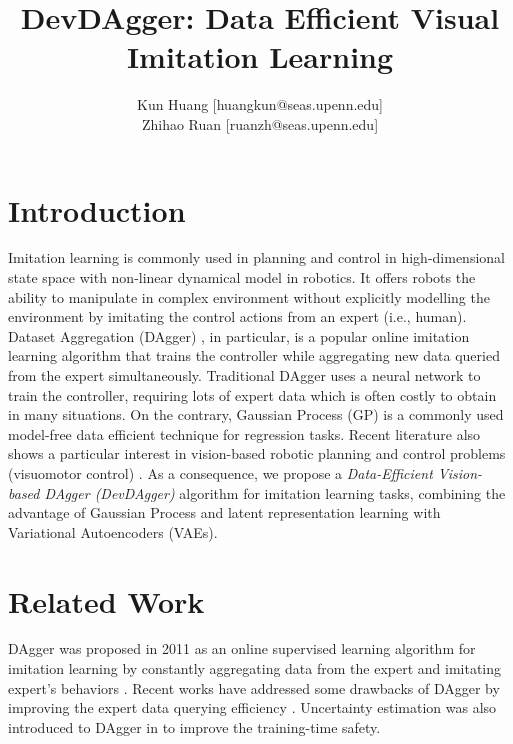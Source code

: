 \documentclass[11pt, reqno, letterpaper, twoside]{amsart}
\title{DevDAgger: Data Efficient Visual Imitation Learning}
\author{
Kun Huang [huangkun@seas.upenn.edu]\\
Zhihao Ruan [ruanzh@seas.upenn.edu] \\
}
\begin{document}

\begin{abstract}
\end{abstract}

\maketitle

\section{Introduction}
Imitation learning is commonly used in planning and control in high-dimensional state space with non-linear dynamical model in robotics. It offers robots the ability to manipulate in complex environment without explicitly modelling the environment by imitating the control actions from an expert (i.e., human). Dataset Aggregation (DAgger) \cite{dagger}, in particular, is a popular online imitation learning algorithm that trains the controller while aggregating new data queried from the expert simultaneously. Traditional DAgger uses a neural network to train the controller, requiring lots of expert data which is often costly to obtain in many situations. On the contrary, Gaussian Process (GP) is a commonly used model-free data efficient technique for regression tasks. Recent literature also shows a particular interest in vision-based robotic planning and control problems (visuomotor control) \cite{vision-based-RL,ebert2018visual,xie2018few}. As a consequence, we propose a \emph{Data-Efficient Vision-based DAgger (DevDAgger)} algorithm for imitation learning tasks, combining the advantage of Gaussian Process and latent representation learning with Variational Autoencoders (VAEs).

\section{Related Work}
DAgger was proposed in 2011 as an online supervised learning algorithm for imitation learning by constantly aggregating data from the expert and imitating expert's behaviors \cite{dagger}. Recent works have addressed some drawbacks of DAgger by improving the expert data querying efficiency \cite{safe-dagger}. Uncertainty estimation was also introduced to DAgger in \cite{ensemble-dagger} to improve the training-time safety.
\end{document}
